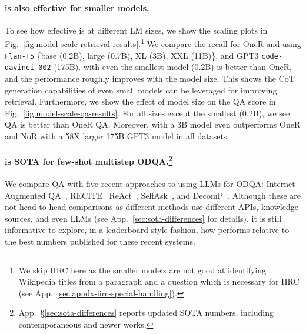 \paragraph{\iconsys is also effective for smaller models.}

To see how effective \iconsys is at different LM sizes, we show the scaling plots in Fig.~\ref{fig:model-scale-retrieval-results}.\footnote{We skip IIRC here as the smaller models are not good at identifying Wikipedia titles from a paragraph and a question which is necessary for IIRC (see App.~\ref{sec:apndx-iirc-special-handling}).} We compare the recall for OneR and \iconsys using \texttt{Flan-T5} \{base (0.2B), large (0.7B), XL (3B), XXL (11B)\}, and GPT3 \texttt{code-davinci-002} (175B). \iconsys with even the smallest model (0.2B) is better than OneR, and the performance roughly improves with the model size. This shows the CoT generation capabilities of even small models can be leveraged for improving retrieval. Furthermore, we show the effect of model size on the QA score in Fig.~\ref{fig:model-scale-qa-results}. For all sizes except the smallest (0.2B), we see \iconsys QA is better than OneR QA. Moreover, \iconsys with a 3B model even outperforms OneR and NoR with a 58X larger 175B GPT3 model in all datasets.


\paragraph{\iconsys is SOTA for few-shot multistep ODQA.\footnote{\label{footnote:sota}App.~\S\ref{sec:sota-differences} reports updated SOTA numbers, including contemporaneous and newer works.}}


We compare \iconsys QA with five recent approaches to using LLMs for ODQA: Internet-Augmented QA~\cite{internet-augmented-qa}, RECITE~\cite{recitationlm} ReAct~\cite{react}, SelfAsk~\cite{selfask}, and DecomP~\cite{old-decomp}. Although these are not head-to-head comparisons as different methods use different APIs, knowledge sources, and even LLMs (see App.~\ref{sec:sota-differences} for details), it is still informative to explore, in a leaderboard-style fashion, how \iconsys performs relative to the best numbers published for these recent systems.

